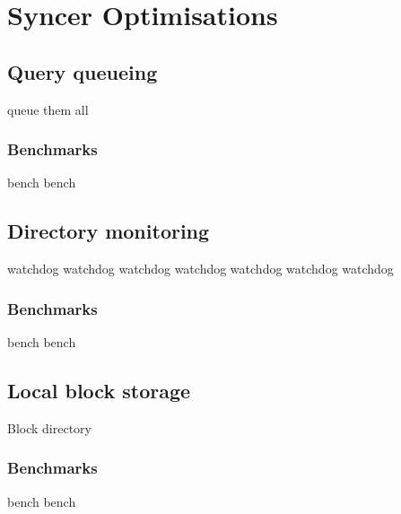 \chapter{Syncer Optimisations}


\section{Query queueing}
  queue them all
  \subsection{Benchmarks}
  bench bench

\section{Directory monitoring}
  watchdog watchdog watchdog watchdog watchdog watchdog watchdog
  \subsection{Benchmarks}
  bench bench

\section{Local block storage}
  Block directory
  \subsection{Benchmarks}
  bench bench
